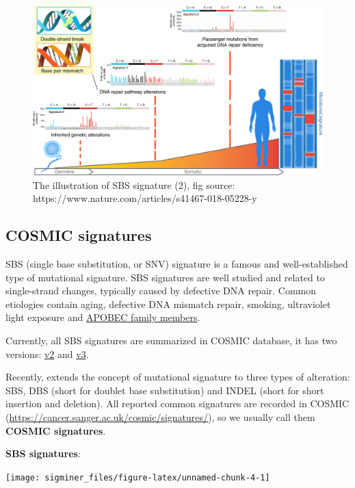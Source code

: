 \documentclass[
  12pt,
  a4paper,
  twoside]{book}
\begin{document}
\begin{figure}
\includegraphics[width=0.95\linewidth]{fig/sbs_signature_overview} \caption{The illustration of SBS signature (2), fig source: https://www.nature.com/articles/s41467-018-05228-y}\label{fig:unnamed-chunk-3}
\end{figure}

\hypertarget{cosmic-signatures}{%
\subsection{COSMIC signatures}\label{cosmic-signatures}}

SBS (single base substitution, or SNV) signature is a famous and well-established type of mutational signature. SBS signatures are well studied and related to single-strand changes, typically caused by defective DNA repair.
Common etiologies contain aging, defective DNA mismatch repair, smoking, ultraviolet light exposure and \href{https://en.wikipedia.org/wiki/APOBEC}{APOBEC family members}.

Currently, all SBS signatures are summarized in COSMIC database, it has two versions: \href{https://cancer.sanger.ac.uk/cosmic/signatures_v2}{v2} and \href{https://cancer.sanger.ac.uk/cosmic/signatures/SBS/}{v3}.

Recently, \citet{alexandrov2020repertoire} extends the concept of mutational signature to three types of alteration: SBS, DBS (short for doublet base substitution) and INDEL (short for short insertion and deletion).
All reported common signatures are recorded in COSMIC (\url{https://cancer.sanger.ac.uk/cosmic/signatures/}), so we usually call them \textbf{COSMIC signatures}.

\textbf{SBS signatures}:

\texttt{[image: sigminer\_files/figure-latex/unnamed-chunk-4-1]}
\end{document}
